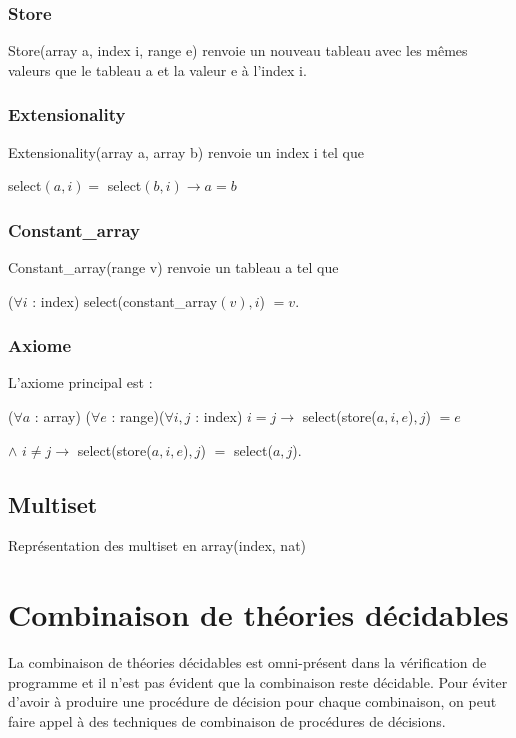 \documentclass[9pt]{book}
\begin{document}
			 \subsubsection{Store}
			Store(array a, index i, range e) renvoie un nouveau tableau avec les m\^emes valeurs que le tableau a et la valeur e \`a l'index i.

 			\subsubsection{Extensionality}
 			Extensionality(array a, array b) renvoie un index i tel que
\par select$(a,i) = $ select$(b,i)\rightarrow a = b $

 			\subsubsection{Constant\_array}
 			Constant\_array(range v) renvoie un tableau a tel que \par
 			($\forall i$ : index) select(constant\_array$(v),i$) $= v$.

			\subsubsection{Axiome}
			L'axiome principal est : \par
 			($\forall a$ : array) ($\forall e$ : range)($\forall i,j$ : index) $i=j \rightarrow$ select(store($a,i,e$)$,j$) $ = e$
			\par $\land$ $i\neq j \rightarrow$ select(store($a,i,e$)$,j$) $=$ select($a,j$).
 		\subsection{Multiset}
 		Repr\'esentation des multiset en array(index, nat)

 	\section{Combinaison de th\'eories d\'ecidables}
 		La combinaison de th\'eories d\'ecidables est omni-pr\'esent dans la v\'erification de programme et il n'est pas \'evident que la combinaison reste d\'ecidable. Pour \'eviter d'avoir \`a produire une proc\'edure de d\'ecision pour chaque combinaison, on peut faire appel \`a des techniques de combinaison de proc\'edures de d\'ecisions.
\end{document}
